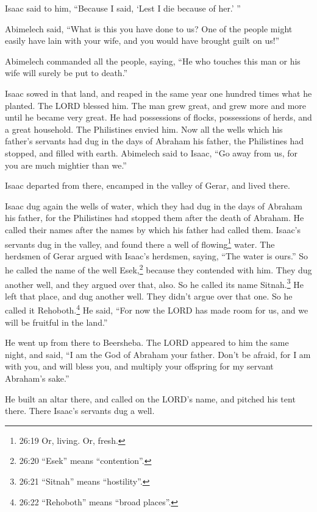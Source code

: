 Isaac said to him, “Because I said, ‘Lest I die because of her.’ ”

\myverse{}Abimelech said, “What is this you have done to us? One of the people might easily have lain with your wife, and you would have brought guilt on us!”

\myverse{}Abimelech commanded all the people, saying, “He who touches this man or his wife will surely be put to death.”

\myverse{}Isaac sowed in that land, and reaped in the same year one hundred times what he planted. The LORD blessed him. \myverse{}The man grew great, and grew more and more until he became very great. \myverse{}He had possessions of flocks, possessions of herds, and a great household. The Philistines envied him. \myverse{}Now all the wells which his father’s servants had dug in the days of Abraham his father, the Philistines had stopped, and filled with earth. \myverse{}Abimelech said to Isaac, “Go away from us, for you are much mightier than we.”

\myverse{}Isaac departed from there, encamped in the valley of Gerar, and lived there.

\myverse{}Isaac dug again the wells of water, which they had dug in the days of Abraham his father, for the Philistines had stopped them after the death of Abraham. He called their names after the names by which his father had called them. \myverse{}Isaac’s servants dug in the valley, and found there a well of flowing\footnote{26:19 Or, living. Or, fresh.} water. \myverse{}The herdsmen of Gerar argued with Isaac’s herdsmen, saying, “The water is ours.” So he called the name of the well Esek,\footnote{26:20 “Esek” means “contention”.} because they contended with him. \myverse{}They dug another well, and they argued over that, also. So he called its name Sitnah.\footnote{26:21 “Sitnah” means “hostility”.} \myverse{}He left that place, and dug another well. They didn’t argue over that one. So he called it Rehoboth.\footnote{26:22 “Rehoboth” means “broad places”.} He said, “For now the LORD has made room for us, and we will be fruitful in the land.”

\myverse{}He went up from there to Beersheba. \myverse{}The LORD appeared to him the same night, and said, “I am the God of Abraham your father. Don’t be afraid, for I am with you, and will bless you, and multiply your offspring for my servant Abraham’s sake.”

\myverse{}He built an altar there, and called on the LORD’s name, and pitched his tent there. There Isaac’s servants dug a well.

